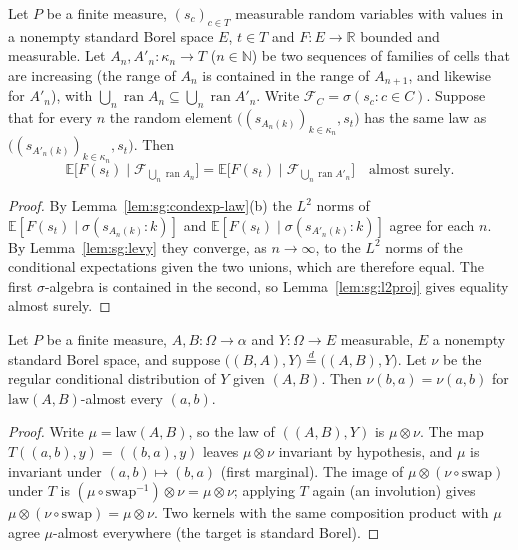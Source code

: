 \begin{lemma}\label{lem:sg:exhaustion}
  \leanok
Let $P$ be a finite measure, $(s_c)_{c\in T}$ measurable random variables with values in a nonempty standard Borel space $E$, $t\in T$ and $F:E\to\mathbb R$ bounded and measurable. Let $A_n,A'_n:\kappa_n\to T$ ($n\in\mathbb N$) be two sequences of
families of cells that are increasing (the range of $A_n$ is contained in the range of $A_{n+1}$, and likewise for $A'_n$), with $\bigcup_n\operatorname{ran}A_n\subseteq\bigcup_n\operatorname{ran}A'_n$. Write $\mathscr F_C=\sigma(s_c:c\in C)$.
Suppose that for every $n$ the random element $\big((s_{A_n(k)})_{k\in\kappa_n},s_t\big)$ has the same law as $\big((s_{A'_n(k)})_{k\in\kappa_n},s_t\big)$. Then
\[\mathbb E\big[F(s_t)\mid\mathscr F_{\bigcup_n\operatorname{ran}A_n}\big]=\mathbb E\big[F(s_t)\mid\mathscr F_{\bigcup_n\operatorname{ran}A'_n}\big]\quad\text{almost surely.}\]
\end{lemma}

\begin{proof}
  \leanok
By Lemma~\ref{lem:sg:condexp-law}(b) the $L^2$ norms of $\mathbb E[F(s_t)\mid\sigma(s_{A_n(k)}:k)]$ and $\mathbb E[F(s_t)\mid\sigma(s_{A'_n(k)}:k)]$ agree for each $n$. By Lemma~\ref{lem:sg:levy} they converge, as $n\to\infty$, to the $L^2$ norms of the conditional
expectations given the two unions, which are therefore equal. The first $\sigma$-algebra is contained in the second, so Lemma~\ref{lem:sg:l2proj} gives equality almost surely.
\end{proof}

\begin{lemma}\label{lem:sg:cond-swap}
  \leanok
Let $P$ be a finite measure, $A,B:\Omega\to\alpha$ and $Y:\Omega\to E$ measurable, $E$ a nonempty standard Borel space, and suppose $\big((B,A),Y\big)\overset d=\big((A,B),Y\big)$. Let $\nu$ be the regular conditional distribution of $Y$ given $(A,B)$. Then
$\nu(b,a)=\nu(a,b)$ for $\mathrm{law}(A,B)$-almost every $(a,b)$.
\end{lemma}

\begin{proof}
  \leanok
Write $\mu=\mathrm{law}(A,B)$, so the law of $((A,B),Y)$ is $\mu\otimes\nu$. The map $T((a,b),y)=((b,a),y)$ leaves $\mu\otimes\nu$ invariant by hypothesis, and $\mu$ is invariant under $(a,b)\mapsto(b,a)$ (first marginal). The image of $\mu\otimes(\nu\circ\mathrm{swap})$ under $T$ is
$(\mu\circ\mathrm{swap}^{-1})\otimes\nu=\mu\otimes\nu$; applying $T$ again (an involution) gives $\mu\otimes(\nu\circ\mathrm{swap})=\mu\otimes\nu$. Two kernels with the same composition product with $\mu$ agree $\mu$-almost everywhere (the target is standard Borel).
\end{proof}

